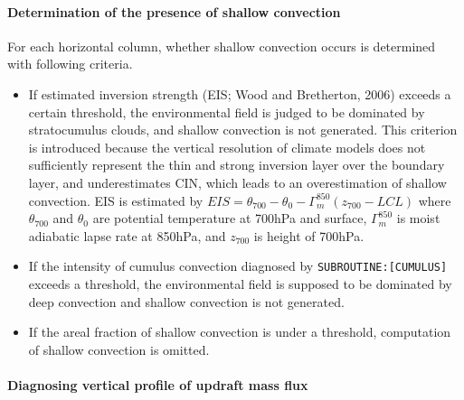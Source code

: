 \hypertarget{presence-of-shallow-convection}{%
\paragraph{Determination of the presence of shallow convection}\label{presence-of-shallow-convection}}

For each horizontal column, whether shallow convection occurs is determined with following criteria.

\begin{itemize}
\item
  If estimated inversion strength (EIS; Wood and Bretherton, 2006) exceeds a certain threshold, the environmental field is judged to be dominated by stratocumulus clouds, and shallow convection is not
  generated. This criterion is introduced because the vertical resolution of climate models does not sufficiently represent the thin and strong inversion layer over the boundary layer, and
  underestimates CIN, which leads to an overestimation of shallow convection. EIS is estimated by \(EIS=\theta_{700}-\theta_{0}-\Gamma_m^{850}(z_{700}-LCL)\) where \(\theta_{700}\) and \(\theta_0\)
  are potential temperature at 700hPa and surface, \(\Gamma_m^{850}\) is moist adiabatic lapse rate at 850hPa, and \(z_{700}\) is height of 700hPa.
\item
  If the intensity of cumulus convection diagnosed by \texttt{SUBROUTINE:{[}CUMULUS{]}} exceeds a threshold, the environmental field is supposed to be dominated by deep convection and shallow
  convection is not generated.
\item
  If the areal fraction of shallow convection is under a threshold, computation of shallow convection is omitted.
\end{itemize}

\hypertarget{diagnosing-vertical-profile-of-updraft-mass-flux}{%
\paragraph{Diagnosing vertical profile of updraft mass flux}\label{diagnosing-vertical-profile-of-updraft-mass-flux}}

